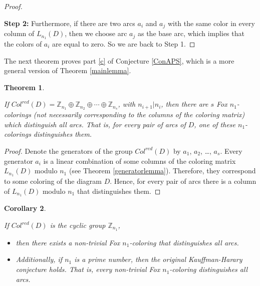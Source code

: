 \documentclass[11pt]{amsart}
\newtheorem{theorem}{Theorem}[section]
\newtheorem{corollary}[theorem]{Corollary}
\begin{document}
\begin{proof}
\

\textbf{Step 2:} Furthermore, if there are two arcs $a_i$ and $a_j$ with the same color in every column of $L_{n_1}(D)$, then we choose arc $a_j$ as the base arc, which implies that the colors of $a_i$ are equal to zero. So we are back to Step 1.

\end{proof}

The next theorem proves part \ref{c} of Conjecture \ref{ConAPS}, which is a more general version of Theorem \ref{mainlemma}.

\begin{theorem}\label{mainlemma2}

    If $Col^{red}(D) = \mathbb Z_{n_1} \oplus \mathbb Z_{n_2} \oplus \cdots \oplus \mathbb Z_{n_s}$, with $n_{i+1} | n_i$, then there are $s$ Fox $n_1$-colorings (not necessarily corresponding to the columns of the coloring matrix) which distinguish all arcs. That is, for every pair of arcs of $D$, one of these $n_{1}$-colorings distinguishes them.
     
\end{theorem}

\begin{proof}

 Denote the generators of the group $Col^{red}(D)$ by $a_1$, $a_2$, \dots, $a_s$. Every generator $a_i$ is a linear combination of some columns of the coloring matrix $L_{n_1}(D)$ modulo $n_1$ (see Theorem \ref{generatorlemma}). Therefore, they correspond to some coloring of the diagram $D$. Hence, for every pair of arcs there is a column of $L_{n_1}(D)$ modulo $n_1$ that distinguishes them. 

\end{proof}

\begin{corollary}\label{Coro}

If $Col^{red}(D)$ is the cyclic group $\mathbb{Z}_{n_1}$,\hfill

\begin{itemize}
    \item [(a)] then there exists a non-trivial Fox $n_1$-coloring that distinguishes all arcs.
    
    \item [(b)] Additionally, if $n_1$ is a prime number, then the original Kauffman-Harary conjecture holds.  That is, every non-trivial Fox $n_1$-coloring distinguishes all arcs.
\end{itemize}

\end{corollary}
\end{document}
